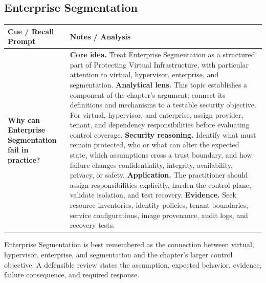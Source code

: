 \documentclass[11pt]{article}
\newcommand{\CornellHeader}{%
\rowcolor{Navy}\color{white}\bfseries Cue / Recall Prompt & \color{white}\bfseries Notes / Analysis\\\hline}
\newcommand{\CornellRow}[2]{%
\cellcolor{CueGray}\RaggedRight\textbf{#1} & \RaggedRight #2\\\hline}
\begin{document}
\subsection*{Enterprise Segmentation}
\begin{longtable}{>{\RaggedRight\arraybackslash}p{}|>{\RaggedRight\arraybackslash}p{}}
\CornellHeader
\CornellRow{Why can Enterprise Segmentation fail in practice?}{\textbf{Core idea.} Treat Enterprise Segmentation as a structured part of Protecting Virtual Infrastructure, with particular attention to virtual, hypervisor, enterprise, and segmentation. \textbf{Analytical lens.} This topic establishes a component of the chapter's argument; connect its definitions and mechanisms to a testable security objective. For virtual, hypervisor, and enterprise, assign provider, tenant, and dependency responsibilities before evaluating control coverage. \textbf{Security reasoning.} Identify what must remain protected, who or what can alter the expected state, which assumptions cross a trust boundary, and how failure changes confidentiality, integrity, availability, privacy, or safety. \textbf{Application.} The practitioner should assign responsibilities explicitly, harden the control plane, validate isolation, and test recovery. \textbf{Evidence.} Seek resource inventories, identity policies, tenant boundaries, service configurations, image provenance, audit logs, and recovery tests.}
\end{longtable}
\begin{topicsummary}
Enterprise Segmentation is best remembered as the connection between virtual, hypervisor, enterprise, and segmentation and the chapter's larger control objective. A defensible review states the assumption, expected behavior, evidence, failure consequence, and required response.
\end{topicsummary}
\end{document}
